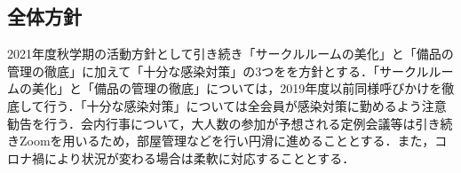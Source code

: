 \subsection*{全体方針}


2021年度秋学期の活動方針として引き続き「サークルルームの美化」と「備品の管理の徹底」に加えて「十分な感染対策」の3つをを方針とする．「サークルルームの美化」と「備品の管理の徹底」については，2019年度以前同様呼びかけを徹底して行う．「十分な感染対策」については全会員が感染対策に勤めるよう注意勧告を行う．会内行事について，大人数の参加が予想される定例会議等は引き続きZoomを用いるため，部屋管理などを行い円滑に進めることとする．また，コロナ禍により状況が変わる場合は柔軟に対応することとする．